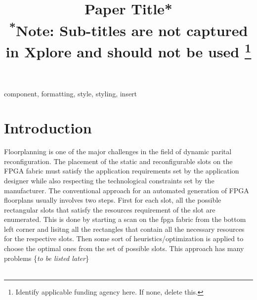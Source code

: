 \documentclass[conference]{IEEEtran}
\begin{document}
\newtheorem{constraint}{\textit{Constraint}}

\title{Paper Title*\\
{\footnotesize \textsuperscript{*}Note: Sub-titles are not captured in Xplore and
should not be used}
\thanks{Identify applicable funding agency here. If none, delete this.}
}

\author{
\and
{}
}

\maketitle

\begin{abstract}

\end{abstract}

\begin{IEEEkeywords}
component, formatting, style, styling, insert
\end{IEEEkeywords}

\section{Introduction}
Floorplanning is one of the major challenges in the field of dynamic parital reconfiguration. The placement of the static and reconfigurable slots on the FPGA fabric must satisfy the application requirements set by the application designer while also respecting the technological constraints set by the manufacturer. The conventional approach for an automated generation of FPGA floorplans usually involves two steps. First for each slot, all the possible rectangular slots that satisfy the resources requirement of the slot are enumerated. This is done by starting a scan on the fpga fabric from the bottom left corner and lisitng all the rectangles that contain all the necessary resources for the respective slots. Then some sort of heuristics/optimization is applied to choose the optimal ones from the set of possible slots. This approach has many problems \{\textit{to be listed later}\}\\\\
\end{document}

